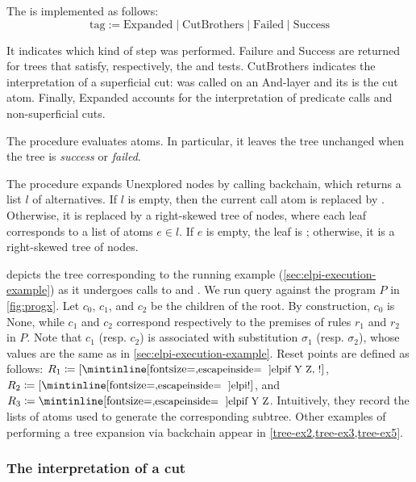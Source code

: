 The \steptag is implemented as follows: 
%
$$\mathrm{tag} := \mathrm{Expanded} \mid \mathrm{CutBrothers} \mid \mathrm{Failed} \mid \mathrm{Success}$$

It indicates which kind of step was
performed.  Failure and Success are returned for trees that satisfy,
respectively, the \failed and \success tests. 
CutBrothers
indicates the interpretation of a superficial cut: \step was called on an 
And-layer and its \pathend is the cut atom. Finally, Expanded
accounts for the interpretation of predicate calls and non-superficial cuts.

The \step procedure evaluates atoms. In particular, it leaves the tree
unchanged when the tree is \emph{success} or \emph{failed}.




The \step procedure expands Unexplored nodes by calling backchain, which returns a list
$l$ of alternatives. If $l$ is empty, then the current call atom is replaced by
\koC. Otherwise, it is replaced by a right-skewed tree of \orC nodes, where
each leaf corresponds to a list of atoms $e \in l$. If $e$ is empty, the leaf
is \okC; otherwise, it is a right-skewed tree of \andC nodes.

 depicts the tree corresponding to the running example
(\cref{sec:elpi-execution-example}) as it undergoes calls to \step and \na.
We run query  against the program $P$ in \cref{fig:progx}. Let $c_0$, $c_1$, and $c_2$
be the children of the root. By construction, $c_0$ is None, while
$c_1$ and $c_2$ correspond respectively to the premises of rules $r_1$ and
$r_2$ in $P$. 
Note that $c_1$ (resp. $c_2$) is associated with
substitution $\sigma_1$ (resp. $\sigma_2$), whose values are the same as in
\cref{sec:elpi-execution-example}. Reset points are defined as follows: %
$R_1 \coloneq [\eI{f Y Z, !}]$, $R_2 \coloneq [\eI{!}]$, and
$R_3 \coloneq \eI{f Y Z}$. Intuitively, they record the lists of atoms used to
generate the corresponding subtree. Other examples of \step performing a
tree expansion via backchain appear in \cref{tree-ex2,tree-ex3,tree-ex5}.

\subsubsection{The interpretation of a cut}

